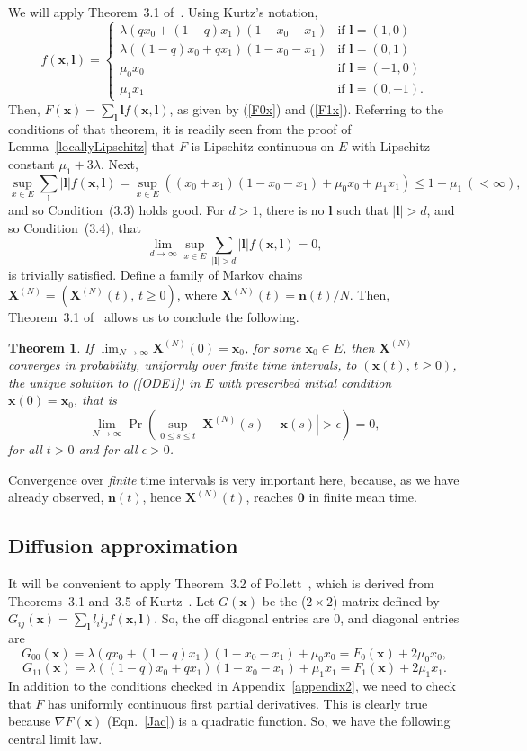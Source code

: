 \documentclass[12pt]{article}
\newtheorem{theorem}{Theorem}
\newcommand{\bl}{\boldsymbol{l}}
\newcommand{\bn}{\boldsymbol{n}}
\newcommand{\bXN}{\boldsymbol{X}^{(N)}}
\newcommand{\bzero}{\boldsymbol{0}}
\newcommand{\bx}{\boldsymbol{x}}
\begin{document}
We will apply Theorem~3.1 of~\cite{Kur70}. Using Kurtz's notation,
$$
f(\bx,\bl) =
\begin{cases}
\lambda(q x_0 + (1-q)x_1)(1-x_0-x_1) &\text{if } \bl=(1,0) \\
\lambda((1-q) x_0 + qx_1)(1-x_0-x_1) &\text{if } \bl=(0,1) \\
\mu_0 x_0 &\text{if } \bl=(-1,0) \\
\mu_1 x_1 &\text{if } \bl=(0,-1).
\end{cases}
$$
Then, $F(\bx)=\sum_{\bl} \bl f(\bx,\bl)$, as given by
(\ref{F0x}) and (\ref{F1x}).
Referring to the conditions of that theorem,
it is readily seen from the proof of Lemma~\ref{locallyLipschitz}
that $F$ is Lipschitz continuous on $E$ with Lipschitz constant
$\mu_1+3\lambda$.
Next,
$$
\sup_{x\in E} \sum_{\bl} |\bl| f(\bx,\bl)
=
\sup_{x\in E} \left( (x_0+x_1)(1-x_0-x_1) + \mu_0 x_0 + \mu_1 x_1
\right) \leq 1+ \mu_1 \ (<\infty),
$$
and so Condition~(3.3) holds good. 
For $d>1$, there is no $\bl$ such
that $|\bl|>d$, and so Condition~(3.4), that
$$
\lim_{d\to\infty} \sup_{x\in E} \sum_{|\bl|>d} |\bl| f(\bx,\bl) =0,
$$
is trivially satisfied.
Define a family of Markov chains $\bXN=(\bXN(t),\, t\geq 0)$,
where $\bXN(t)=\bn(t)/N$. Then, Theorem~3.1 of~\cite{Kur70} allows
us to conclude the following.

\begin{theorem}
\label{LLN}
If $\lim_{N \to \infty} \bXN(0)=\bx_0$,
for some $\bx_0\in E$, then
$\bXN$ converges in probability, uniformly
over finite time intervals, to $(\bx(t),\, t\geq 0)$,
the unique solution to (\ref{ODE1}) in $E$ with prescribed initial
condition $\bx(0)=\bx_0$, that is
$$
\lim_{N \to \infty}
\Pr\left(\sup_{0\leq s\leq t} \left| \bXN(s)-\bx(s)\right|>\epsilon\right)=0,
$$
for all $t>0$ and for all $\epsilon>0$.
\end{theorem}

\noindent
Convergence over {\em finite\/} time intervals is very important here,
because, as we have already observed, $\bn(t)$, hence $\bXN(t)$, reaches
$\bzero$ in finite mean time.

\subsection{Diffusion approximation}
\label{appendix3}

It will be convenient to apply Theorem~3.2 of Pollett~\cite{Pol90},
which is derived from Theorems~3.1 and~3.5 of Kurtz~\cite{Kur71}. 
Let $G(\bx)$ be the ($2\times 2$) matrix defined by
$G_{ij}(\bx) =\sum_{\bl} l_i l_j f(\bx,\bl)$.
So, the off diagonal entries are $0$, and diagonal entries are
$$
G_{00}(\bx) = \lambda(q x_0 + (1-q)x_1)(1-x_0-x_1)+\mu_0 x_0
= F_0(\bx)+2\mu_0 x_0,
$$
$$
G_{11}(\bx) = \lambda((1-q) x_0 + q x_1)(1-x_0-x_1)+\mu_1 x_1
= F_1(\bx)+2\mu_1 x_1.
$$
In addition to the conditions checked in Appendix~\ref{appendix2},
we need to check that $F$ has uniformly continuous first partial
derivatives. This is clearly true because
$\nabla F(\bx)$ (Eqn.~\ref{Jac}) is a quadratic function. 
So, we have the following central limit law.
\end{document}
